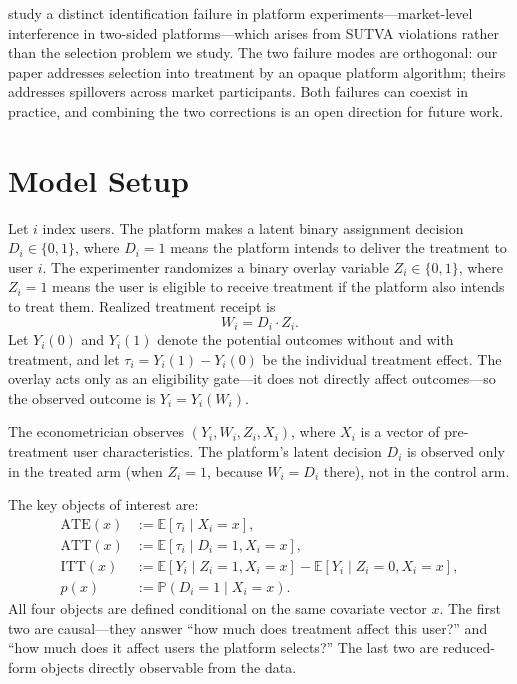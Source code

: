 \documentclass[12pt]{article}
\newcommand{\E}{\mathbb{E}}
\newcommand{\Prob}{\mathbb{P}}
\newcommand{\ATT}{\mathrm{ATT}}
\newcommand{\ATE}{\mathrm{ATE}}
\newcommand{\ITT}{\mathrm{ITT}}
\begin{document}
\citet{johari2022experimental} study a distinct identification failure in
platform experiments---market-level interference in two-sided platforms---which
arises from SUTVA violations rather than the selection problem we study.
The two failure modes are orthogonal: our paper addresses selection
into treatment by an opaque platform algorithm; theirs addresses
spillovers across market participants. Both failures can coexist in
practice, and combining the two corrections is an open direction for
future work.

\section{Model Setup}
\label{sec:setup}

Let $i$ index users. The platform makes a latent binary assignment decision
$D_i \in \{0,1\}$, where $D_i = 1$ means the platform intends to deliver
the treatment to user $i$. The experimenter randomizes a binary overlay
variable $Z_i \in \{0,1\}$, where $Z_i = 1$ means the user is eligible to
receive treatment if the platform also intends to treat them. Realized
treatment receipt is
\[
  W_i = D_i \cdot Z_i.
\]
Let $Y_i(0)$ and $Y_i(1)$ denote the potential outcomes without and with
treatment, and let $\tau_i = Y_i(1) - Y_i(0)$ be the individual treatment
effect. The overlay acts only as an eligibility gate---it does not directly
affect outcomes---so the observed outcome is $Y_i = Y_i(W_i)$.

The econometrician observes $(Y_i, W_i, Z_i, X_i)$, where $X_i$ is a vector
of pre-treatment user characteristics. The platform's latent decision $D_i$
is observed only in the treated arm (when $Z_i = 1$, because $W_i = D_i$
there), not in the control arm.

The key objects of interest are:
\begin{align*}
  \ATE(x) &:= \E[\tau_i \mid X_i = x], \\
  \ATT(x) &:= \E[\tau_i \mid D_i = 1, X_i = x], \\
  \ITT(x) &:= \E[Y_i \mid Z_i = 1, X_i = x] - \E[Y_i \mid Z_i = 0, X_i = x], \\
  p(x)    &:= \Prob(D_i = 1 \mid X_i = x).
\end{align*}
All four objects are defined conditional on the same covariate vector $x$.
The first two are causal---they answer ``how much does treatment affect this
user?'' and ``how much does it affect users the platform selects?'' The last
two are reduced-form objects directly observable from the data.
\end{document}
